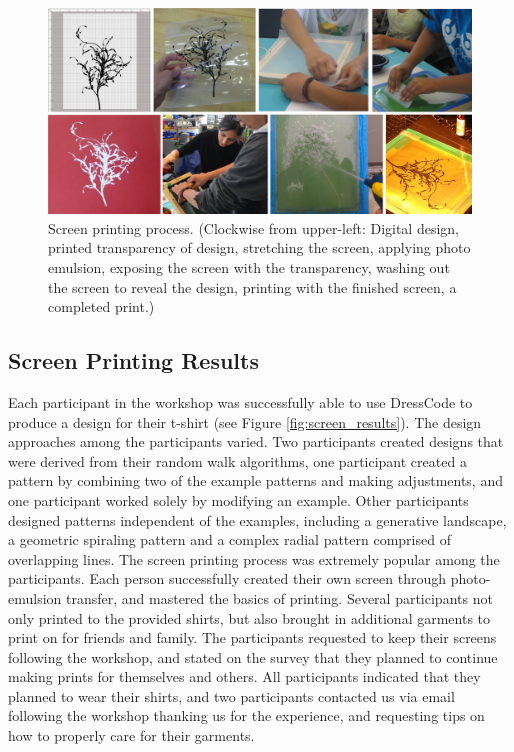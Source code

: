 \documentclass{sigchi}
\begin{document}
\begin{center}
\begin{figure}[h!]
\includegraphics[width=\columnwidth]{images/screen_printing_process.png}
\caption{Screen printing process. (Clockwise from upper-left: Digital design, printed transparency of design, stretching the screen, applying photo emulsion, exposing the screen with the transparency, washing out the screen to reveal the design, printing with the finished screen, a completed print.) }
\label{fig:screen_printing_process}
\end{figure}
\end{center}
\vspace{-20pt}

\subsection{Screen Printing Results}
Each participant in the workshop was successfully able to use DressCode to produce a design for their t-shirt (see Figure \ref{fig:screen_results}). The design approaches among the participants varied. Two participants created designs that were derived from their random walk algorithms, one participant created a pattern by combining two of the example patterns and making adjustments, and one participant worked solely by modifying an example. Other participants designed patterns independent of the examples, including a generative landscape, a geometric spiraling pattern and a complex radial pattern comprised of overlapping lines. The screen printing process was extremely popular among the participants. Each person successfully created their own screen through photo-emulsion transfer, and mastered the basics of printing. Several participants not only printed to the provided shirts, but also brought in additional garments to print on for friends and family. The participants requested to keep their screens following the workshop, and stated on the survey that they planned to continue making prints for themselves and others. All participants indicated that they planned to wear their shirts, and two participants contacted us via email following the workshop thanking us for the experience, and requesting tips on how to properly care for their garments. 
\end{document}
